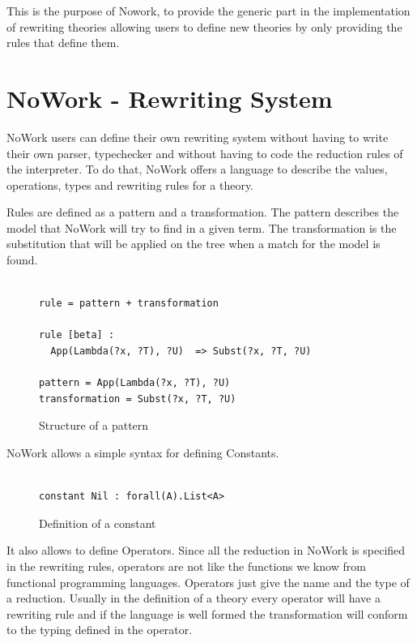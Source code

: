\documentclass[12pt,a4paper]{article}
\begin{document}
This is the purpose of Nowork, to provide the generic part in the
implementation of rewriting theories allowing users to define new
theories by only providing the rules that define them.



\section{ NoWork - Rewriting System }

NoWork users can define their own rewriting system without having to
write their own parser, typechecker and without having to code the
reduction rules of the interpreter. To do that, NoWork offers a language 
to describe the values, operations, types and rewriting rules for a theory.

Rules are defined as a pattern and a transformation. The pattern
describes the model that NoWork will try to find in a given term. The 
transformation is the substitution that will be applied on the tree when
a match for the model is found.

\begin{figure}[!h]
\begin{center}
\begin{verbatim}

rule = pattern + transformation

rule [beta] :
  App(Lambda(?x, ?T), ?U)  => Subst(?x, ?T, ?U)

pattern = App(Lambda(?x, ?T), ?U) 
transformation = Subst(?x, ?T, ?U)

\end{verbatim}
\end{center}
\caption{Structure of a pattern}
\end{figure}

NoWork allows a simple syntax for defining Constants.

\begin{figure}[!h]
\begin{verbatim}

constant Nil : forall(A).List<A>
\end{verbatim}
\caption{Definition of a constant}
\end{figure}


It also allows to define Operators. Since all the
reduction in NoWork is specified in the rewriting rules, operators 
are not like the functions we know from functional programming languages. 
Operators just give the name and the type of a reduction. Usually in the
definition of a theory every operator will have a rewriting rule
and if the language is well formed the transformation will conform to
the typing defined in the operator.
\end{document}
